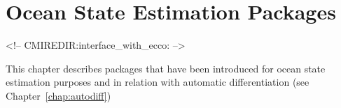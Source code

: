 
\chapter{Ocean State Estimation Packages}
\begin{rawhtml}
<!-- CMIREDIR:interface_with_ecco: -->
\end{rawhtml}
\label{chap.ecco}

This chapter describes packages that have been introduced for ocean state estimation purposes and in relation with automatic differentiation (see Chapter~\ref{chap:autodiff})



\newpage



\newpage



\newpage




%

\newpage


